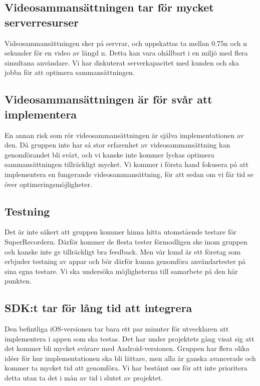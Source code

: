 \subsection{Videosammansättningen tar för mycket serverresurser}
Videosammansättningen sker på servrar, och uppskattas ta mellan 0.75n och n sekunder för en video av längd n. Detta kan vara ohållbart i en miljö med flera simultana användare. Vi har diskuterat serverkapacitet med kunden och ska jobba för att optimera sammansättningen.

\subsection{Videosammansättningen är för svår att implementera}
En annan risk som rör videosammansättningen är själva implementationen av den. Då gruppen inte har så stor erfarenhet av videosammansättning kan genomförandet bli svårt, och vi kanske inte kommer lyckas optimera sammansättningen tillräckligt mycket. Vi kommer i första hand fokusera på att implementera en fungerande videosammansättning, för att sedan om vi får tid se över optimeringsmöjligheter.

\subsection{Testning}
Det är inte säkert att gruppen kommer hinna hitta utomstående testare för SuperRecordern. Därför kommer de flesta tester förmodligen ske inom gruppen och kanske inte ge tillräckligt bra feedback. Men vår kund är ett företag som erbjuder testning av appar och bör därför kunna genomföra användartester på sina egna testare. Vi ska undersöka möjligheterna till samarbete på den här punkten.

\subsection{SDK:t tar för lång tid att integrera}
Den befintliga iOS-versionen tar bara ett par minuter för utvecklaren att implementera i appen som ska testas. Det har under projektets gång visat sig att det kommer bli mycket svårare med Android-versionen. Gruppen har flera olika idéer för hur implementationen ska bli lättare, men alla är ganska avancerade och kommer ta mycket tid att genomföra. Vi har bestämt oss för att inte prioritera detta utan ta det i mån av tid i slutet av projektet.

